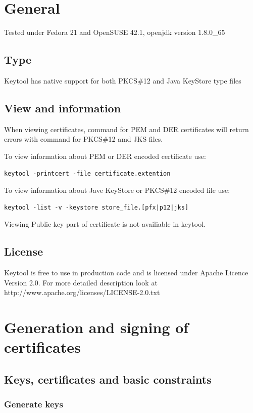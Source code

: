 \documentclass[10pt, a4paper]{report}
\begin{document}
{\section{General}

Tested under Fedora 21 and OpenSUSE 42.1, openjdk version 1.8.0\_65

  \subsection{Type}
Keytool has native support for both PKCS\#12 and Java KeyStore type files 
  \subsection{View and information}
When viewing certificates, command for PEM and DER certificates will return errors with command for PKCS\#12 amd JKS files.

To view information about PEM or DER encoded certificate use:
\begin{verbatim}
keytool -printcert -file certificate.extention
\end{verbatim}

To view information about Jave KeyStore or PKCS\#12 encoded file use:
\begin{verbatim}
keytool -list -v -keystore store_file.[pfx|p12|jks]
\end{verbatim}

Viewing Public key part of certificate is not availiable in keytool.

  \subsection{License}
Keytool is free to use in production code and is licensed under Apache Licence Version 2.0. For more detailed description look at http://www.apache.org/licenses/LICENSE-2.0.txt
  
\section{Generation and signing of certificates}

  \subsection{Keys, certificates and basic constraints}
  
    \subsubsection{Generate keys}
    
}
\end{document}
